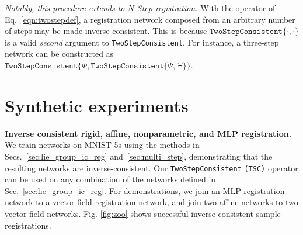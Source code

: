 \noindent
\emph{Notably, this procedure extends to $N$-Step registration.} With the operator of Eq.~\eqref{eqn:twostepdef}, a registration network composed from an arbitrary number of steps may be made inverse consistent. This is because $\texttt{TwoStepConsistent}\{\cdot,\cdot\}$ is a valid \emph{second} argument to
\texttt{TwoStepConsistent}. For instance, a three-step network can be constructed as
$	\texttt{TwoStepConsistent}\{\Phi, \texttt{TwoStepConsistent}\{\Psi, \Xi\}\}$.


\section{Synthetic experiments}
\label{sec:synthetic_experiments}

\textbf{Inverse consistent rigid, affine, nonparametric, and MLP registration.} We train networks on MNIST 5s using the methods in Secs.~\ref{sec:lie_group_ic_reg} and~\ref{sec:multi_step}, demonstrating
that the resulting networks are inverse-consistent. Our \texttt{TwoStepConsistent} \texttt{(TSC)} operator can be used on any combination of the networks defined in Sec.~\ref{sec:lie_group_ic_reg}. For demonstrations, we
join an MLP registration network to a vector field registration network, and join two affine networks to two vector field networks. Fig. \ref{fig:zoo} shows successful inverse-consistent sample registrations.

